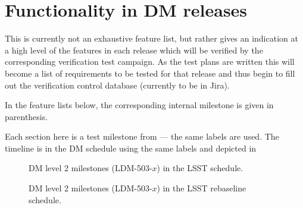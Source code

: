 \section{Functionality in DM releases}
\label{sect:features}

This is currently not an exhaustive feature list, but rather gives an indication at a high level of the features in each release which will be verified by the corresponding verification test campaign.
As the test plans are written this will become a list of requirements to be tested for that release and thus begin to fill out the verification control database (currently to be in Jira).

In the feature lists below, the corresponding internal milestone is given in parenthesis.

Each section here is a test milestone from  --- the same labels are used.
The timeline is in the DM schedule using the same labels and depicted in 

\begin{figure}[htbp]
        \begin{center}
                 
                 \caption{DM level 2 milestones (LDM-503-$x$) in the LSST schedule.}
                 \label{fig:schedule}
         \end{center}
 \end{figure}

\begin{figure}[htbp]
        \begin{center}
                 
                 \caption{DM level 2 milestones (LDM-503-$x$) in the LSST rebaseline schedule.}
                 \label{fig:fschedule}
         \end{center}
 \end{figure}


